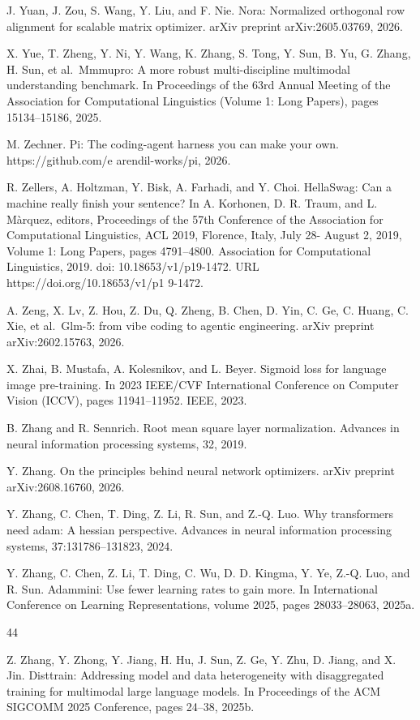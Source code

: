 \documentclass[
  10
]{article}
\begin{document}
J. Yuan, J. Zou, S. Wang, Y. Liu, and F. Nie. Nora: Normalized
orthogonal row alignment for scalable matrix optimizer. arXiv preprint
arXiv:2605.03769, 2026.

X. Yue, T. Zheng, Y. Ni, Y. Wang, K. Zhang, S. Tong, Y. Sun, B. Yu, G.
Zhang, H. Sun, et al.~Mmmupro: A more robust multi-discipline multimodal
understanding benchmark. In Proceedings of the 63rd Annual Meeting of
the Association for Computational Linguistics (Volume 1: Long Papers),
pages 15134--15186, 2025.

M. Zechner. Pi: The coding-agent harness you can make your own.
https://github.com/e arendil-works/pi, 2026.

R. Zellers, A. Holtzman, Y. Bisk, A. Farhadi, and Y. Choi. HellaSwag:
Can a machine really finish your sentence? In A. Korhonen, D. R. Traum,
and L. Màrquez, editors, Proceedings of the 57th Conference of the
Association for Computational Linguistics, ACL 2019, Florence, Italy,
July 28- August 2, 2019, Volume 1: Long Papers, pages 4791--4800.
Association for Computational Linguistics, 2019. doi:
10.18653/v1/p19-1472. URL https://doi.org/10.18653/v1/p1 9-1472.

A. Zeng, X. Lv, Z. Hou, Z. Du, Q. Zheng, B. Chen, D. Yin, C. Ge, C.
Huang, C. Xie, et al.~Glm-5: from vibe coding to agentic engineering.
arXiv preprint arXiv:2602.15763, 2026.

X. Zhai, B. Mustafa, A. Kolesnikov, and L. Beyer. Sigmoid loss for
language image pre-training. In 2023 IEEE/CVF International Conference
on Computer Vision (ICCV), pages 11941--11952. IEEE, 2023.

B. Zhang and R. Sennrich. Root mean square layer normalization. Advances
in neural information processing systems, 32, 2019.

Y. Zhang. On the principles behind neural network optimizers. arXiv
preprint arXiv:2608.16760, 2026.

Y. Zhang, C. Chen, T. Ding, Z. Li, R. Sun, and Z.-Q. Luo. Why
transformers need adam: A hessian perspective. Advances in neural
information processing systems, 37:131786--131823, 2024.

Y. Zhang, C. Chen, Z. Li, T. Ding, C. Wu, D. D. Kingma, Y. Ye, Z.-Q.
Luo, and R. Sun. Adammini: Use fewer learning rates to gain more. In
International Conference on Learning Representations, volume 2025, pages
28033--28063, 2025a.

44

Z. Zhang, Y. Zhong, Y. Jiang, H. Hu, J. Sun, Z. Ge, Y. Zhu, D. Jiang,
and X. Jin. Disttrain: Addressing model and data heterogeneity with
disaggregated training for multimodal large language models. In
Proceedings of the ACM SIGCOMM 2025 Conference, pages 24--38, 2025b.
\end{document}
